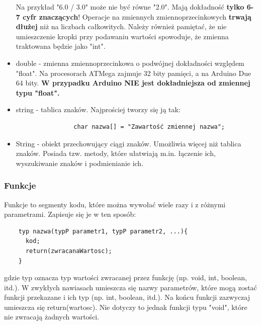 \documentclass[a4paper,12pt, twoside]{article}
\begin{document}
\begin{itemize}
				Na przykład "6.0 / 3.0" może nie być równe "2.0". Mają dokładność \textbf{tylko 6-7 cyfr znaczących}! Operacje na zmiennych zmiennoprzecinkowych \textbf{trwają dłużej} niż na liczbach całkowitych.
				Należy również pamiętać, że nie umieszczenie kropki przy podawaniu wartości spowoduje, że zmienna traktowana będzie jako "int".
			\item double - zmienna zmiennoprzecinkowa o podwójnej dokładności względem "float". Na procesorach ATMega zajmuje 32 bity pamięci, a na Arduino Due 64 bity.
				\textbf{W przypadku Arduino NIE jest dokładniejsza od zmiennej typu "float".}
			\item string - tablica znaków. Najprościej tworzy się ją tak:
				\begin{verbatim}
				char nazwa[] = "Zawartość zmiennej nazwa";
				\end{verbatim}
			\item String - obiekt przechowujący ciągi znaków. Umożliwia więcej niż tablica znaków. Posiada tzw. metody, które ułatwiają m.in. łączenie ich, wyszukiwanie znaków i podmienianie ich.
		\end{itemize}
	
\subsubsection{Funkcje}
	Funkcje to segmenty kodu, które można wywołać wiele razy i z różnymi parametrami.
	Zapisuje się je w ten sposób:
	\begin{verbatim}
	typ nazwa(typP parametr1, typP parametr2, ...){
	  kod;
	  return(zwracanaWartosc);
	}
	\end{verbatim}
	gdzie typ oznacza typ wartości zwracanej przez funkcję (np. void, int, boolean, itd.).
	W zwykłych nawiasach umieszcza się nazwy parametrów, które mogą zostać funkcji przekazane i ich typ (np. int, boolean, itd.). Na końcu funkcji zazwyczaj umieszcza się return(wartosc). Nie dotyczy to jednak funkcji typu "void", które nie zwracają żadnych wartości.
	
\end{document}
